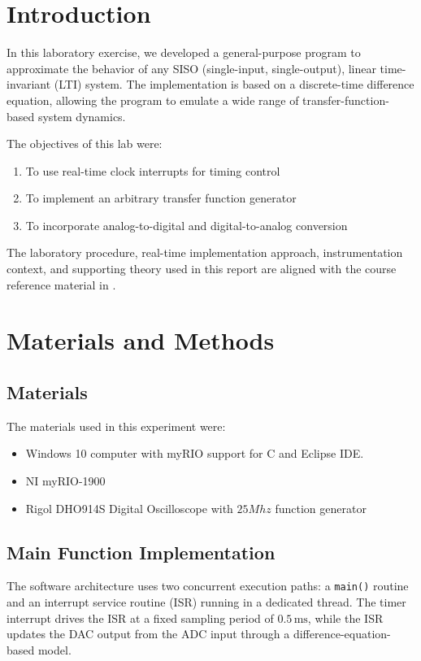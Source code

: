 \documentclass[10pt,twocolumn]{article}
\begin{document}

\section{Introduction} 
\label{sec:introduction}
In this laboratory exercise, we developed a general-purpose program to approximate the behavior of any SISO (single-input, single-output), linear time-invariant (LTI) system. The implementation is based on a discrete-time difference equation, allowing the program to emulate a wide range of transfer-function-based system dynamics.

The objectives of this lab were:
\begin{enumerate}
	\item To use real-time clock interrupts for timing control
	\item To implement an arbitrary transfer function generator
	\item To incorporate analog-to-digital and digital-to-analog conversion
\end{enumerate}

The laboratory procedure, real-time implementation approach, instrumentation context, and supporting theory used in this report are aligned with the course reference material in \citep{Picone2024}.

\section{Materials and Methods}

\subsection{Materials}
The materials used in this experiment were:
\begin{itemize}
	\item Windows 10 computer with myRIO support for C and Eclipse IDE.
	\item NI myRIO-1900
	\item Rigol DHO914S Digital Oscilloscope with $25 Mhz$ function generator
\end{itemize}

\subsection{Main Function Implementation}
The software architecture uses two concurrent execution paths: a \texttt{main()} routine and an interrupt service routine (ISR) running in a dedicated thread. The timer interrupt drives the ISR at a fixed sampling period of $0.5\,\text{ms}$, while the ISR updates the DAC output from the ADC input through a difference-equation-based model.
\end{document}
